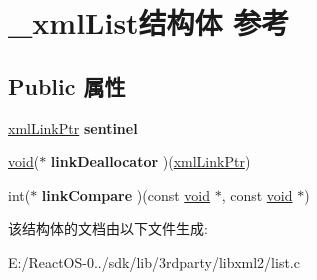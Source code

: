 \hypertarget{struct__xml_list}{}\section{\+\_\+xml\+List结构体 参考}
\label{struct__xml_list}
\subsection*{Public 属性}
\begin{DoxyCompactItemize}
\item 
\mbox{\label{struct__xml_list_a8ac9209901e59674b432b6624794526a}} 
\hyperlink{struct__xml_link}{xml\+Link\+Ptr} {\bfseries sentinel}
\item 
\mbox{\label{struct__xml_list_ad57c2291cbabb41f61c3a892c9285d08}} 
\hyperlink{interfacevoid}{void}($\ast$ {\bfseries link\+Deallocator} )(\hyperlink{struct__xml_link}{xml\+Link\+Ptr})
\item 
\mbox{\label{struct__xml_list_a1471b769be3d3b5d467af9fb4c4a3ab6}} 
int($\ast$ {\bfseries link\+Compare} )(const \hyperlink{interfacevoid}{void} $\ast$, const \hyperlink{interfacevoid}{void} $\ast$)
\end{DoxyCompactItemize}


该结构体的文档由以下文件生成\+:\begin{DoxyCompactItemize}
\item 
E\+:/\+React\+O\+S-\/0../sdk/lib/3rdparty/libxml2/list.\+c\end{DoxyCompactItemize}
